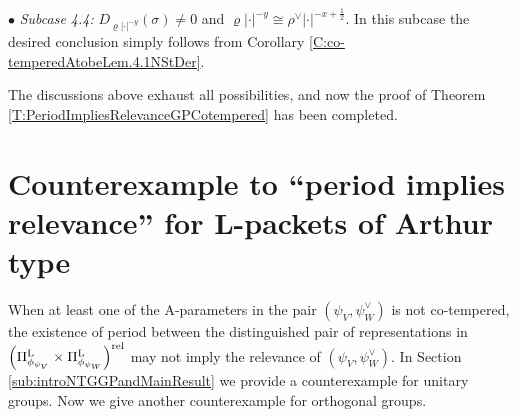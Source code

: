 \documentclass[11pt,letterpaper]{amsart}
\theoremstyle{plain}
\numberwithin{theorem}{section}
\numberwithin{equation}{subsection}
\theoremstyle{remark}
\def\LP{\Pi^{\rm L}} %
\def\rel{{\rm rel}} %
\begin{document}
\vskip 5pt

$\bullet$\textit{ Subcase 4.4:} $D_{\varrho|\cdot|^{-y}}\left(\sigma\right)\neq0$ and $\varrho|\cdot|^{-y}\cong\rho^\vee|\cdot|^{-x+\frac{1}{2}}$. In this subcase the desired conclusion simply follows from Corollary \ref{C:co-temperedAtobeLem.4.1NStDer}.

\vskip 5pt

The discussions above exhaust all possibilities, and now the proof of Theorem \ref{T:PeriodImpliesRelevanceGPCotempered} has been completed.


\section{Counterexample to ``period implies relevance'' for L-packets of Arthur type}\label{sec:counterexample}

When at least one of the A-parameters in the pair \(\left(\psi_V,\psi_W^{\vee}\right)\) is not co-tempered, the existence of period between the distinguished pair of representations in \(\left(\LP_{\phi_{\psi_V}}\times\LP_{\phi_{\psi_W}}\right)^{\rel}\) may not imply the relevance of \(\left(\psi_V,\psi_W^{\vee}\right)\). In Section \ref{sub:introNTGGPandMainResult} we provide a counterexample for unitary groups. Now we give another counterexample for orthogonal groups.

\vskip 5pt
\end{document}
